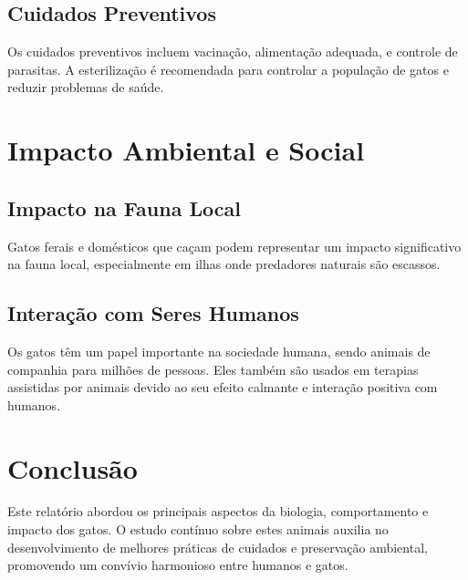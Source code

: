 \documentclass[a4paper,12pt]{report}
\begin{document}
\section{Cuidados Preventivos}
Os cuidados preventivos incluem vacinação, alimentação adequada, e controle de parasitas. A esterilização é recomendada para controlar a população de gatos e reduzir problemas de saúde.

\chapter{Impacto Ambiental e Social}
\section{Impacto na Fauna Local}
Gatos ferais e domésticos que caçam podem representar um impacto significativo na fauna local, especialmente em ilhas onde predadores naturais são escassos.

\section{Interação com Seres Humanos}
Os gatos têm um papel importante na sociedade humana, sendo animais de companhia para milhões de pessoas. Eles também são usados em terapias assistidas por animais devido ao seu efeito calmante e interação positiva com humanos.

\chapter{Conclusão}
Este relatório abordou os principais aspectos da biologia, comportamento e impacto dos gatos. O estudo contínuo sobre estes animais auxilia no desenvolvimento de melhores práticas de cuidados e preservação ambiental, promovendo um convívio harmonioso entre humanos e gatos.
\end{document}
